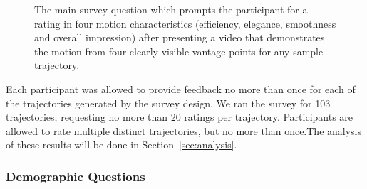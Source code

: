 \documentclass[letterpaper, 10 pt, conference]{ieeeconf}  %
\begin{document}
\begin{figure}
    \caption{The main survey question which prompts the participant for a rating in four motion characteristics (efficiency, elegance, smoothness and overall impression) after presenting a video that demonstrates the motion from four clearly visible vantage points for any sample trajectory.}
    \label{fig:survey_question}
\end{figure}

Each participant was allowed to provide feedback no more than once for each of the trajectories generated by the survey design. We ran the survey for 103 trajectories, requesting no more than 20 ratings per trajectory. Participants are allowed to rate multiple distinct trajectories, but no more than once.The analysis of these results will be done in Section~\ref{sec:analysis}.

\subsubsection{Demographic Questions}
\end{document}

